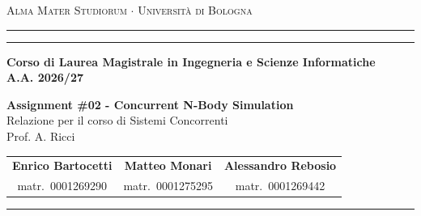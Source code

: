 \hypersetup{pageanchor=false}
\begin{titlepage}
  \begin{center}
    {{\Large{\textsc{Alma Mater Studiorum $\cdot$ Università di Bologna}}}}\\[1ex]
    \rule[0.1cm]{15.8cm}{0.1mm}
    \rule[0.5cm]{15.8cm}{0.6mm}
    {\small{\bf Corso di Laurea Magistrale in Ingegneria e Scienze Informatiche \\ A.A. 2026/27 }}
  \end{center}

  \vfill
  \begin{center}
    {\LARGE\textbf{Assignment \#02 - Concurrent N-Body Simulation}}\\[2.5ex]
    {\LARGE Relazione per il corso di Sistemi Concorrenti}\\[2.5ex]
    {\LARGE Prof. A. Ricci}
  \end{center}
  \vfill

  \begin{center}
    \begin{tabular}{@{}c@{\qquad}c@{\qquad}c@{}}
      {\large\bf Enrico Bartocetti} & {\large\bf Matteo Monari} & {\large\bf Alessandro Rebosio} \\[0.5ex]
      {\small matr.\ 0001269290 } & {\small matr.\ 0001275295} & {\small matr.\ 0001269442}
    \end{tabular}
  \end{center}

  \vspace{2mm}
  \noindent\rule{\linewidth}{0.4pt}

\end{titlepage}
\hypersetup{pageanchor=true}

